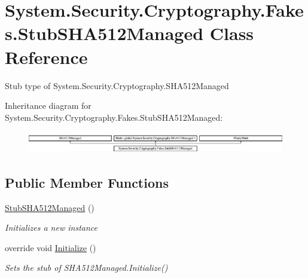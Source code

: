 \hypertarget{class_system_1_1_security_1_1_cryptography_1_1_fakes_1_1_stub_s_h_a512_managed}{\section{System.\-Security.\-Cryptography.\-Fakes.\-Stub\-S\-H\-A512\-Managed Class Reference}
\label{class_system_1_1_security_1_1_cryptography_1_1_fakes_1_1_stub_s_h_a512_managed}
}


Stub type of System.\-Security.\-Cryptography.\-S\-H\-A512\-Managed 


Inheritance diagram for System.\-Security.\-Cryptography.\-Fakes.\-Stub\-S\-H\-A512\-Managed\-:\begin{figure}[H]
\begin{center}
\leavevmode
\includegraphics[height=0.964686cm]{class_system_1_1_security_1_1_cryptography_1_1_fakes_1_1_stub_s_h_a512_managed}
\end{center}
\end{figure}
\subsection*{Public Member Functions}
\begin{DoxyCompactItemize}
\item 
\hyperlink{class_system_1_1_security_1_1_cryptography_1_1_fakes_1_1_stub_s_h_a512_managed_a71e01eb65e886e1d74142aa0610200b9}{Stub\-S\-H\-A512\-Managed} ()
\begin{DoxyCompactList}\small\item\em Initializes a new instance\end{DoxyCompactList}\item 
override void \hyperlink{class_system_1_1_security_1_1_cryptography_1_1_fakes_1_1_stub_s_h_a512_managed_ae006a0cdc3ac87dc3b8b82b07808a9aa}{Initialize} ()
\begin{DoxyCompactList}\small\item\em Sets the stub of S\-H\-A512\-Managed.\-Initialize()\end{DoxyCompactList}\end{DoxyCompactItemize}
